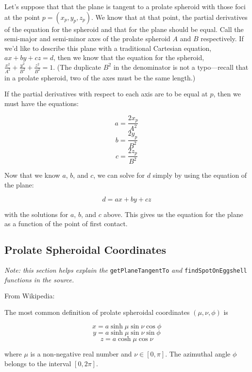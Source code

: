 \documentclass[11pt]{article}
\begin{document}
Let's suppose that that the plane is tangent to a prolate spheroid with those foci at the point $p = (x_p,y_p,z_p)$. We know that at that point, the partial derivatives of the equation for the spheroid and that for the plane should be equal. Call the semi-major and semi-minor axes of the prolate spheroid $A$ and $B$ respectively. If we'd like to describe this plane with a traditional Cartesian equation, $ax + by + cz = d$, then we know that the equation for the spheroid, $\frac{x^2}{A^2} + \frac{y^2}{B^2} + \frac{z^2}{B^2} = 1$. (The duplicate $B^2$ in the denominator is not a typo---recall that in a prolate spheroid, two of the axes must be the same length.)

If the partial derivatives with respect to each axis are to be equal at $p$, then we must have the equations:

\begin{equation}
a = \frac{2x_p}{A^2}
\end{equation}
\begin{equation}
b = \frac{2y_p}{B^2}
\end{equation}
\begin{equation}
c = \frac{2z_p}{B^2}
\end{equation}

Now that we know $a$, $b$, and $c$, we can solve for $d$ simply by using the equation of the plane:

\begin{equation}
d = ax + by + cz
\end{equation}

with the solutions for $a$, $b$, and $c$ above. This gives us the equation for the plane as a function of the point of first contact.

\subsection{Prolate Spheroidal Coordinates}

\emph{Note: this section helps explain the} \texttt{getPlaneTangentTo} \emph{and} \texttt{findSpotOnEggshell} \emph{functions in the source.}

From Wikipedia:

\begin{displayquote}

The most common definition of prolate spheroidal coordinates $(\mu, \nu, \phi)$ is

\begin{equation}
x = a \sinh \mu \sin \nu \cos \phi
\end{equation}
\begin{equation}
y = a \sinh \mu \sin \nu \sin \phi
\end{equation}
\begin{equation}
z = a \cosh \mu \cos \nu
\end{equation}

where $\mu$ is a non-negative real number and $\nu \in [0, \pi]$. The azimuthal angle $\phi$ belongs to the interval $[0, 2\pi]$.

\end{displayquote}
\end{document}
